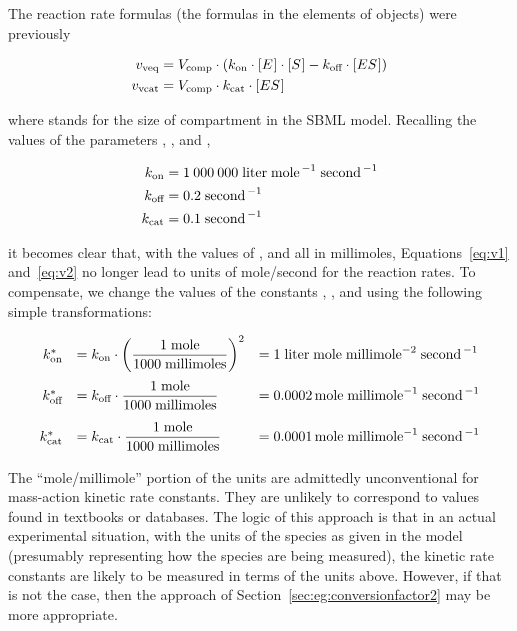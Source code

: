 The reaction rate formulas (\ie the formulas in the 
elements of \KineticLaw objects) were previously
\begin{linenomath}
  \begin{align}
    \label{eq:v1}
    v_\text{veq}  & = V_\text{comp} \cdot (k_\text{on} \cdot [E\mkern1mu] \cdot [S\mkern1mu] - k_\text{off} \cdot [ES\mkern1mu])\\
    \label{eq:v2}
    v_\text{vcat} & = V_\text{comp} \cdot k_\text{cat} \cdot [ES\mkern1mu]
  \end{align}
\end{linenomath}
where \Vcomp stands for the size of compartment  in the
SBML model.  Recalling the values of the parameters \kon, \koff,
and \kcat,
\begin{linenomath}
  \begin{align*}
    k_\text{on}         &= 1\:000\:000 \; \text{liter} \; \text{mole}^{\,-1} \; \text{second}^{\,-1}\\
    k_\text{off}        &= 0.2 \; \text{second}^{\,-1}\\
    k_\text{cat}        &= 0.1 \; \text{second}^{\,-1}
  \end{align*}
\end{linenomath}
it becomes clear that, with the values of , 
and  all in \unit{millimoles}, Equations~\ref{eq:v1}
and~\ref{eq:v2} no longer lead to units of
\unit{mole}/\unit{second} for the reaction rates.  To compensate,
we change the values of the constants \kon, \koff, and \kcat using
the following simple transformations:
\begin{linenomath}
  \begin{equation*}
    \begin{array}{rll}
      k_\text{on}^{*} &= k_\text{on} \cdot \left( \dfrac{1 \; \text{mole}}{1000 \; \text{millimoles}} \right)^{2}
      &= 1 \; \text{liter} \; \text{mole} \; \text{millimole}^{-2} \; \text{second}^{\,-1} \\[12pt]
      k_\text{off}^{*} &= k_\text{off} \cdot \dfrac{1 \; \text{mole}}{1000 \; \text{millimoles}}
      &= 0.0002 \, \text{mole} \; \text{millimole}^{-1} \; \text{second}^{\,-1} \\[12pt]
      k_\text{cat}^{*} &= k_\text{cat} \cdot \dfrac{1 \; \text{mole}}{1000 \; \text{millimoles}}
      &= 0.0001 \, \text{mole} \; \text{millimole}^{-1} \; \text{second}^{\,-1} \\[5pt]
    \end{array}
  \end{equation*}
\end{linenomath}
The ``\unit{mole}/\unit{millimole}'' portion of the units are
admittedly unconventional for mass-action kinetic rate constants.
They are unlikely to correspond to values found in textbooks or
databases.  The logic of this approach is that in an actual
experimental situation, with the units of the species as given in
the model (presumably representing how the species are being
measured), the kinetic rate constants are likely to be measured in
terms of the units above.  However, if that is not the case, then
the approach of Section~\ref{sec:eg:conversionfactor2} may be more
appropriate.


